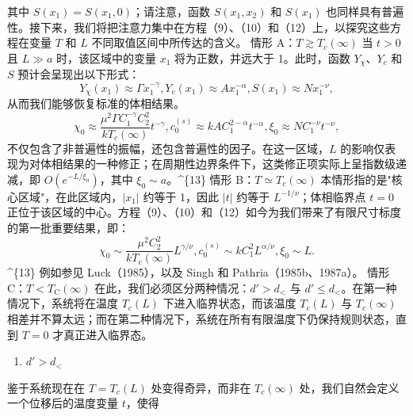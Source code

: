 其中 \(S(x_{1})=S(x_{1},0)\)；请注意，函数 \(S(x_{1},x_{2})\) 和 \(S(x_{1})\) 也同样具有普遍性。接下来，我们将把注意力集中在方程（9）、（10）和（12）上，以探究这些方程在变量 \(T\) 和 \(L\) 不同取值区间中所传达的含义。
情形 A：\(T \gtrsim T_{c}(\infty)\)
当 \(t > 0\) 且 \(L \gg a\) 时，该区域中的变量 \(x_{1}\) 将为正数，并远大于 1。此时，函数 \(Y_{\chi}\)、\(Y_{c}\) 和 \(S\) 预计会呈现出以下形式：
\begin{equation}\tag{14.4.63}\label{eq:14.4.63}
Y _ { \chi } ( x _ { 1 } ) \approx \Gamma x _ { 1 } ^{- \gamma} ,  Y _ { c } ( x _ { 1 } ) \approx A x _ { 1 } ^{- \alpha} ,  S ( x _ { 1 } ) \approx N x _ { 1 } ^{- \nu} ,
\end{equation}
从而我们能够恢复标准的体相结果。
\begin{equation}\tag{14.4.64}\label{eq:14.4.64}
\chi _ { 0 } \approx \frac { \mu ^{2} \Gamma C _ { 1 } ^{- \gamma} C _ { 2 } ^{2} } { k T _ { c } ( \infty ) } t ^{- \gamma} ,  c _ { 0 } ^{( s )} \approx k A C _ { 1 } ^{2 - \alpha} t ^{- \alpha} ,  \xi _ { 0 } \approx N C _ { 1 } ^{- \nu} t ^{- \nu} ,
\end{equation}
不仅包含了非普遍性的振幅，还包含普遍性的因子。在这一区域，\(L\) 的影响仅表现为对体相结果的一种修正；在周期性边界条件下，这类修正项实际上呈指数级递减，即 \(O(e^{-L/\xi_0})\)，其中 \(\xi_0 \sim a\)。\^{}\{13\}
情形 B：\(T \simeq T_{c}(\infty)\)
本情形指的是"核心区域"，在此区域内，\(|x_{1}|\) 约等于 1，因此 \(|t|\) 约等于 \(L^{-1/\nu}\)；体相临界点 \(t=0\) 正位于该区域的中心。方程（9）、（10）和（12）如今为我们带来了有限尺寸标度的第一批重要结果，即：
\begin{equation}\tag{14.4.65}\label{eq:14.4.65}
\chi _ { 0 } \sim \frac { \mu ^{2} C _ { 2 } ^{2} } { k T _ { c } ( \infty ) } L ^{\gamma / \nu} ,  c _ { 0 } ^{( s )} \sim k C _ { 1 } ^{2} L ^{\alpha / \nu} ,  \xi _ { 0 } \sim L .
\end{equation}
\^{}\{13\} 例如参见 Luck（1985），以及 Singh 和 Pathria（1985b、1987a）。
情形 C：\(T < T_{\mathrm{C}}(\infty)\)
在此，我们必须区分两种情况：\(d' > d_{<}\) 与 \(d' \leq d_{<}\)。在第一种情况下，系统将在温度 \(T_{c}(L)\) 下进入临界状态，而该温度 \(T_{c}(L)\) 与 \(T_{c}(\infty)\) 相差并不算太远；而在第二种情况下，系统在所有有限温度下仍保持规则状态，直到 \(T = 0\) 才真正进入临界态。
\begin{enumerate}
\def\labelenumi{(\roman{enumi})}
\item
  \(d' > d_{<}\)
\end{enumerate}
鉴于系统现在在 \(T = T_{c}(L)\) 处变得奇异，而非在 \(T_{c}(\infty)\) 处，我们自然会定义一个位移后的温度变量 \(t\)，使得
